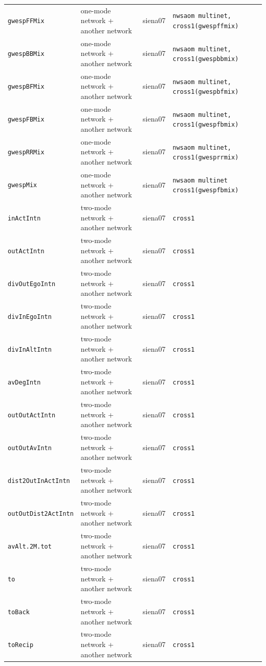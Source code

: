 \begin{longtable}{@{}p{2.6cm}p{3.2cm}p{2.9cm}p{5.4cm}@{}}
\texttt{gwespFFMix} & one-mode network + another network & siena07 & \texttt{nwsaom multinet, cross1(gwespffmix)}\\
\texttt{gwespBBMix} & one-mode network + another network & siena07 & \texttt{nwsaom multinet, cross1(gwespbbmix)}\\
\texttt{gwespBFMix} & one-mode network + another network & siena07 & \texttt{nwsaom multinet, cross1(gwespbfmix)}\\
\texttt{gwespFBMix} & one-mode network + another network & siena07 & \texttt{nwsaom multinet, cross1(gwespfbmix)}\\
\texttt{gwespRRMix} & one-mode network + another network & siena07 & \texttt{nwsaom multinet, cross1(gwesprrmix)}\\
\texttt{gwespMix} & one-mode network + another network & siena07 & \texttt{nwsaom multinet cross1(gwespfbmix)}\\
\texttt{inActIntn} & two-mode network + another network & siena07 & \texttt{cross1}\\
\texttt{outActIntn} & two-mode network + another network & siena07 & \texttt{cross1}\\
\texttt{divOutEgoIntn} & two-mode network + another network & siena07 & \texttt{cross1}\\
\texttt{divInEgoIntn} & two-mode network + another network & siena07 & \texttt{cross1}\\
\texttt{divInAltIntn} & two-mode network + another network & siena07 & \texttt{cross1}\\
\texttt{avDegIntn} & two-mode network + another network & siena07 & \texttt{cross1}\\
\texttt{outOutActIntn} & two-mode network + another network & siena07 & \texttt{cross1}\\
\texttt{outOutAvIntn} & two-mode network + another network & siena07 & \texttt{cross1}\\
\texttt{dist2OutInActIntn} & two-mode network + another network & siena07 & \texttt{cross1}\\
\texttt{outOutDist2ActIntn} & two-mode network + another network & siena07 & \texttt{cross1}\\
\texttt{avAlt.2M.tot} & two-mode network + another network & siena07 & \texttt{cross1}\\
\texttt{to} & two-mode network + another network & siena07 & \texttt{cross1}\\
\texttt{toBack} & two-mode network + another network & siena07 & \texttt{cross1}\\
\texttt{toRecip} & two-mode network + another network & siena07 & \texttt{cross1}\\

\end{longtable}
